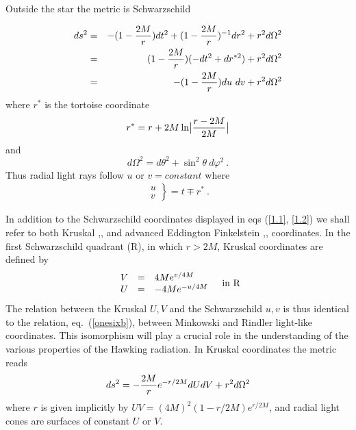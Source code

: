 \documentclass[12pt,oneside]{report}
\begin{document}
Outside the star the  metric is Schwarzschild

\begin{eqnarray} 
ds^2& =&- (1 - {2M \over r}) dt^2 + (1 -{2M \over r})^{-1} dr^2 + r^2
d \Omega ^2  \label {1.1} \\\nonumber
& =& (1 - {2M \over r}) (-dt^2 + dr ^{ *2}) + r^2 d \Omega
^2 \nonumber\\
 & =& -(1- {2M \over r}) du\ dv + r ^2 d \Omega^2 \label {1.2} 
\end {eqnarray}
where $ r ^{*}$ is the tortoise coordinate 
\begin{eqnarray}
 r^* = r + 2M \ln \bigl\vert { r-2M \over 2M}\bigr\vert  \label {1.3} 
\end{eqnarray}
and 
\begin{equation}
d\Omega^2 = d \theta^2 + \sin^2 \theta\ d \varphi^2\ . \label{1.3B}
\end{equation}
Thus radial light rays follow $u$ or $v= constant$ where
\begin{eqnarray} 
\left.\begin{array}{r}
u \\ v
\end{array} \right\} = t \mp r ^* \ .\label {1.4}
\end{eqnarray}



In addition to the Schwarzschild coordinates displayed in eqs (\ref{1.1}, 
\ref {1.2}) we
shall refer to both Kruskal \cite{Krus},\cite{MTW}, and advanced  Eddington
Finkelstein \cite{Eddi},\cite{Fink},\cite{MTW} coordinates. In the first
Schwarzschild quadrant (R),  in which $r> 2M$, Kruskal coordinates are defined by 
\begin{equation}
\begin{array}{rcl} 
V&=& 4M e^{v/4M}  \\
 U& = &- 4M e^{-u/4M} 
\end{array}
\quad \hbox{in R} \label{1.5} 
\end{equation}
The relation between the Kruskal $U,V$ and the Schwarzschild $u,v$ is thus
identical to the relation, eq.~(\ref{onesixb}), 
between Minkowski and Rindler light-like coordinates. This
isomorphism will play a crucial role in the understanding of the various
properties of the Hawking radiation. 
In Kruskal coordinates the metric reads
\begin{equation}
ds^2 =-{2 M \over r} e^{-r/2M}  dUdV  +
r^2d \Omega ^2 \label{1.6} 
\end{equation}
where $r$ is given implicitly by $UV = (4M)^2 (1 - r/2M) e^{r/2M}$, 
and radial light cones are surfaces of constant $U$ or $V$.
\end{document}
